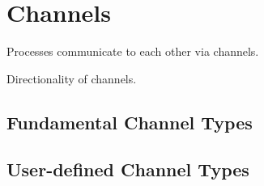 

\chapter{Channels}
\label{sec:channels}

Processes communicate to each other via channels.  

Directionality of channels.  

\section{Fundamental Channel Types}
\label{sec:channels:fundamental}

\section{User-defined Channel Types}
\label{sec:channels:userdef}

